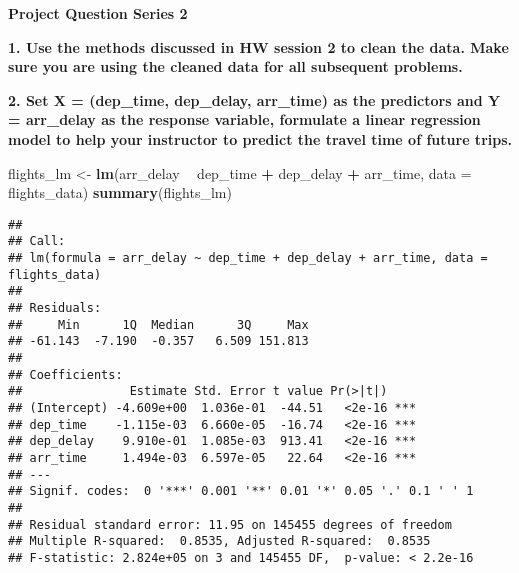 \documentclass[
]{article}
\newenvironment{Shaded}{\begin{snugshade}}{\end{snugshade}}
\newcommand{\CommentTok}[1]{\textcolor[rgb]{0.56,0.35,0.01}{\textit{#1}}}
\newcommand{\DataTypeTok}[1]{\textcolor[rgb]{0.13,0.29,0.53}{#1}}
\newcommand{\DecValTok}[1]{\textcolor[rgb]{0.00,0.00,0.81}{#1}}
\newcommand{\KeywordTok}[1]{\textcolor[rgb]{0.13,0.29,0.53}{\textbf{#1}}}
\newcommand{\NormalTok}[1]{#1}
\newcommand{\OperatorTok}[1]{\textcolor[rgb]{0.81,0.36,0.00}{\textbf{#1}}}
\newcommand{\StringTok}[1]{\textcolor[rgb]{0.31,0.60,0.02}{#1}}
\begin{document}
\textbf{Project Question Series 2}

\textbf{1. Use the methods discussed in HW session 2 to clean the data.
Make sure you are using the cleaned data for all subsequent problems.}

\begin{Shaded}
\end{Shaded}

\textbf{2. Set X = (dep\_time, dep\_delay, arr\_time) as the predictors
and Y = arr\_delay as the response variable, formulate a linear
regression model to help your instructor to predict the travel time of
future trips.}

\begin{Shaded}
\begin{Highlighting}[]
\NormalTok{flights_lm <-}\StringTok{ }\KeywordTok{lm}\NormalTok{(arr_delay }\OperatorTok{~}\StringTok{ }\NormalTok{dep_time }\OperatorTok{+}\StringTok{ }\NormalTok{dep_delay }\OperatorTok{+}\StringTok{ }\NormalTok{arr_time, }\DataTypeTok{data =}\NormalTok{ flights_data)}
\KeywordTok{summary}\NormalTok{(flights_lm)}
\end{Highlighting}
\end{Shaded}

\begin{verbatim}
## 
## Call:
## lm(formula = arr_delay ~ dep_time + dep_delay + arr_time, data = flights_data)
## 
## Residuals:
##     Min      1Q  Median      3Q     Max 
## -61.143  -7.190  -0.357   6.509 151.813 
## 
## Coefficients:
##               Estimate Std. Error t value Pr(>|t|)    
## (Intercept) -4.609e+00  1.036e-01  -44.51   <2e-16 ***
## dep_time    -1.115e-03  6.660e-05  -16.74   <2e-16 ***
## dep_delay    9.910e-01  1.085e-03  913.41   <2e-16 ***
## arr_time     1.494e-03  6.597e-05   22.64   <2e-16 ***
## ---
## Signif. codes:  0 '***' 0.001 '**' 0.01 '*' 0.05 '.' 0.1 ' ' 1
## 
## Residual standard error: 11.95 on 145455 degrees of freedom
## Multiple R-squared:  0.8535, Adjusted R-squared:  0.8535 
## F-statistic: 2.824e+05 on 3 and 145455 DF,  p-value: < 2.2e-16
\end{verbatim}
\end{document}
